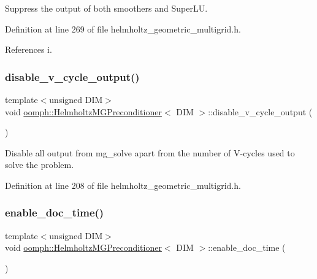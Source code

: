 Suppress the output of both smoothers and Super\+LU. 



Definition at line 269 of file helmholtz\+\_\+geometric\+\_\+multigrid.\+h.



References i.

\mbox{\label{classoomph_1_1HelmholtzMGPreconditioner_a2b5549471018be9d22b5ecdc95c9c113}} 
\subsubsection{\texorpdfstring{disable\+\_\+v\+\_\+cycle\+\_\+output()}{disable\_v\_cycle\_output()}}
{\footnotesize\ttfamily template$<$unsigned D\+IM$>$ \\
void \hyperlink{classoomph_1_1HelmholtzMGPreconditioner}{oomph\+::\+Helmholtz\+M\+G\+Preconditioner}$<$ D\+IM $>$\+::disable\+\_\+v\+\_\+cycle\+\_\+output (\begin{DoxyParamCaption}{ }\end{DoxyParamCaption})\hspace{0.3cm}{\ttfamily [inline]}}



Disable all output from mg\+\_\+solve apart from the number of V-\/cycles used to solve the problem. 



Definition at line 208 of file helmholtz\+\_\+geometric\+\_\+multigrid.\+h.

\mbox{\label{classoomph_1_1HelmholtzMGPreconditioner_a9a67bdd2dc6b32b89026fb5e70c4883f}} 
\subsubsection{\texorpdfstring{enable\+\_\+doc\+\_\+time()}{enable\_doc\_time()}}
{\footnotesize\ttfamily template$<$unsigned D\+IM$>$ \\
void \hyperlink{classoomph_1_1HelmholtzMGPreconditioner}{oomph\+::\+Helmholtz\+M\+G\+Preconditioner}$<$ D\+IM $>$\+::enable\+\_\+doc\+\_\+time (\begin{DoxyParamCaption}{ }\end{DoxyParamCaption})\hspace{0.3cm}{\ttfamily [inline]}}



